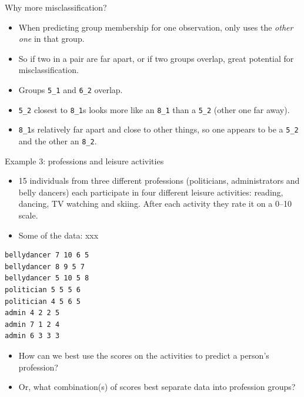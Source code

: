 \documentclass[ignorenonframetext,]{beamer}
\begin{document}
\begin{frame}[fragile]{Why more misclassification?}
\protect\hypertarget{why-more-misclassification}{}

\begin{itemize}
\item
  When predicting group membership for one observation, only uses the
  \emph{other one} in that group.
\item
  So if two in a pair are far apart, or if two groups overlap, great
  potential for misclassification.
\item
  Groups \texttt{5\_1} and \texttt{6\_2} overlap.
\item
  \texttt{5\_2} closest to \texttt{8\_1}s looks more like an
  \texttt{8\_1} than a \texttt{5\_2} (other one far away).
\item
  \texttt{8\_1}s relatively far apart and close to other things, so one
  appears to be a \texttt{5\_2} and the other an \texttt{8\_2}.
\end{itemize}

\end{frame}

\begin{frame}[fragile]{Example 3: professions and leisure activities}
\protect\hypertarget{example-3-professions-and-leisure-activities}{}

\begin{itemize}
\item
  15 individuals from three different professions (politicians,
  administrators and belly dancers) each participate in four different
  leisure activities: reading, dancing, TV watching and skiing. After
  each activity they rate it on a 0--10 scale.
\item
  Some of the data: xxx
\end{itemize}

\small

\begin{verbatim}
bellydancer 7 10 6 5
bellydancer 8 9 5 7
bellydancer 5 10 5 8
politician 5 5 5 6
politician 4 5 6 5
admin 4 2 2 5
admin 7 1 2 4
admin 6 3 3 3
\end{verbatim}

\normalsize

\begin{itemize}
\item
  How can we best use the scores on the activities to predict a person's
  profession?
\item
  Or, what combination(s) of scores best separate data into profession
  groups?
\end{itemize}

\end{frame}
\end{document}
